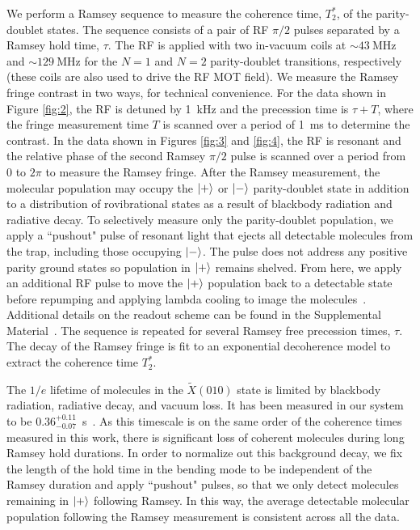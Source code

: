 \documentclass[
superscriptaddress,
twocolumn,
amsmath,amssymb,
aps,
prx,
nofootinbib,
]{revtex4-2}
\begin{document}
We perform a Ramsey sequence to measure the coherence time, $T_2^*$, of the parity-doublet states. The sequence consists of a pair of RF $\pi/2$ pulses separated by a Ramsey hold time, $\tau$. The RF is applied with two in-vacuum coils at $\sim$$43~\text{MHz}$ and $\sim$$129~\text{MHz}$ for the $N=1$ and $N=2$ parity-doublet transitions, respectively (these coils are also used to drive the RF MOT field). We measure the Ramsey fringe contrast in two ways, for technical convenience. For the data shown in Figure \ref{fig:2}, the RF is detuned by 1~kHz and the precession time is $\tau + T$, where the fringe measurement time $T$ is scanned over a period of 1~ms to determine the contrast. In the data shown in Figures \ref{fig:3} and \ref{fig:4}, the RF is resonant and the relative phase of the second Ramsey $\pi/2$ pulse is scanned over a period from $0$ to $2\pi$ to measure the Ramsey fringe. After the Ramsey measurement, the molecular population may occupy the $\ket{+}$ or $\ket{-}$ parity-doublet state in addition to a distribution of rovibrational states as a result of blackbody radiation and radiative decay. To selectively measure only the parity-doublet population, we apply a ``pushout" pulse of resonant light that ejects all detectable molecules from the trap, including those occupying $\ket{-}$. The pulse does not address any positive parity ground states so population in $\ket{+}$ remains shelved. From here, we apply an additional RF pulse to move the $\ket{+}$ population back to a detectable state before repumping and applying lambda cooling to image the molecules~\cite{hallas2022optical}. Additional details on the readout scheme can be found in the Supplemental Material~\cite{Supplemental}. The sequence is repeated for several Ramsey free precession times, $\tau$. The decay of the Ramsey fringe is fit to an exponential decoherence model to extract the coherence time $T_2^*$.

The $1/e$ lifetime of molecules in the $\tilde{X}(010)$ state is limited by blackbody radiation, radiative decay, and vacuum loss. It has been measured in our system to be $0.36_{-0.07}^{+0.11}$~s~\cite{hallas2022optical, vilas2023blackbody}. As this timescale is on the same order of the coherence times measured in this work, there is significant loss of coherent molecules during long Ramsey hold durations. In order to normalize out this background decay, we fix the length of the hold time in the bending mode to be independent of the Ramsey duration and apply ``pushout" pulses, so that we only detect molecules remaining in $\ket{+}$ following Ramsey. In this way, the average detectable molecular population following the Ramsey measurement is consistent across all the data.
\end{document}

